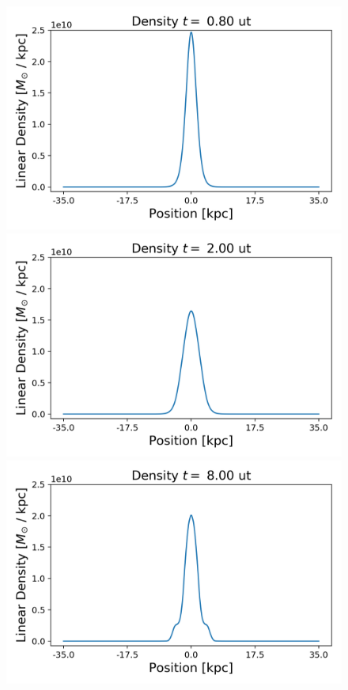 \begin{figure}[h!]
    \centering
    \includegraphics[scale=0.45]{imag/gaussD2.png}
    \includegraphics[scale=0.45]{imag/gaussD5.png}
    \includegraphics[scale=0.45]{imag/gaussD20.png}

\end{figure}
